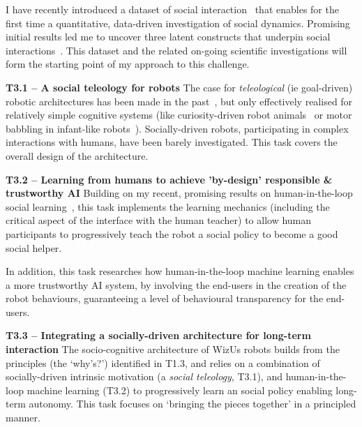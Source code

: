 \documentclass[11pt,a4paper]{report}
\newcommand{\project}{WizUs\xspace}
\begin{document}
I have recently introduced a dataset of social
interaction~\cite{lemaignan2018pinsoro} that enables for the first time a
quantitative, data-driven investigation of social dynamics. Promising initial
results led me to uncover three latent constructs that underpin social
interactions~\cite{bartlett2019what}. This dataset and the related on-going
scientific investigations will form the starting point of my approach to this
challenge.







\textbf{T3.1 -- A social teleology for robots}
The case for \emph{teleological} (ie goal-driven) robotic architectures has been
made in the past~\cite{wrede2012towards}, but only effectively realised for
relatively simple cognitive systems (like curiosity-driven robot
animals~\cite{oudeyer2005playground} or motor babbling in infant-like
robots~\cite{forestier2017unified}). Socially-driven robots, participating in
complex interactions with humans, have been barely investigated. This task
covers the overall design of the architecture.


\textbf{T3.2 -- Learning from humans to achieve 'by-design' responsible \&
trustworthy AI} Building on my recent, promising results on human-in-the-loop
social learning~\cite{senft2017supervised,senft2019teaching,winkle2020coach}, this task
implements the learning mechanics (including the critical aspect of the
interface with the human teacher) to allow human participants to progressively
teach the robot a social policy to become a good social helper.

In addition, this task researches how human-in-the-loop machine learning enables a more
trustworthy AI system, by involving the end-users in the creation of the robot
behaviours, guaranteeing a level of behavioural transparency for the end-users.

\textbf{T3.3 -- Integrating a socially-driven architecture for long-term interaction} The
socio-cognitive architecture of \project robots builds from the principles (the
`why's?') identified in T1.3, and relies on a combination of socially-driven
intrinsic motivation (a \emph{social teleology}, T3.1), and human-in-the-loop machine
learning (T3.2) to progressively learn an social policy enabling long-term
autonomy. This task focuses on `bringing the pieces together' in a principled
manner.
\end{document}
